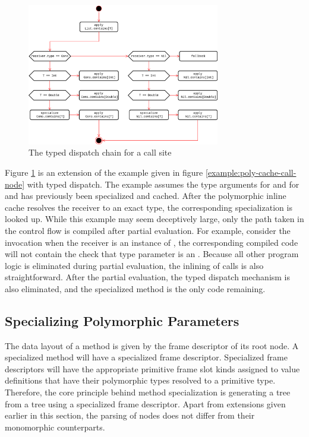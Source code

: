 \begin{figure}[!htb]
	\centering
	\includegraphics[width=0.75\textwidth]{figures/tastytruffle-type-dispatch-chain.png}
	\caption{The typed dispatch chain for a  call site}
	\label{example:typed-dispatch}
\end{figure}

Figure \ref{example:typed-dispatch} is an extension of the example given in figure \ref{example:poly-cache-call-node} with typed dispatch.
The example assumes the type arguments for  and  for  and  has previously been specialized and cached.
After the polymorphic inline cache resolves the receiver to an exact type, the corresponding specialization is looked up.
While this example may seem deceptively large, only the path taken in the control flow is compiled after partial evaluation.
For example, consider the invocation  when the receiver is an instance of , the corresponding compiled code will not contain the check that type parameter is an .
Because all other program logic is eliminated during partial evaluation, the inlining of calls is also straightforward.
After the partial evaluation, the typed dispatch mechanism is also eliminated, and the specialized method is the only code remaining.

\subsection{Specializing Polymorphic Parameters}

The data layout of a method is given by the frame descriptor of its root node.
A specialized method will have a specialized frame descriptor.
Specialized frame descriptors will have the appropriate primitive frame slot kinds assigned to value definitions that have their polymorphic types resolved to a primitive type.
Therefore, the core principle behind method specialization is generating a  tree from a  tree using a specialized frame descriptor.
Apart from extensions given earlier in this section, the parsing of  nodes does not differ from their monomorphic counterparts.

